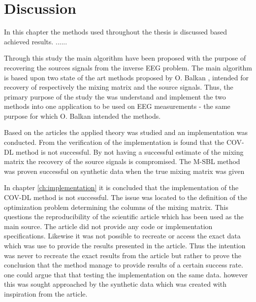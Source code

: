 \chapter{Discussion}
In this chapter the methods used throughout the thesis is discussed based achieved results.  
...... 


Through this study the main algorithm have been proposed with the purpose of recovering the sources signals from the inverse EEG problem. 
The main algorithm is based upon two state of the art methods proposed by O. Balkan \cite{Cov}\cite{M-SBL},
intended for recovery of respectively the mixing matrix and the source signals.  
Thus, the primary purpose of the study the was understand and implement the two methods into one application to be used on EEG measurements - the same purpose for which O. Balkan intended the methods. 

Based on the articles the applied theory was studied and an implementation was conducted. From the verification of the implementation is found that the COV-DL method is not successful. By not having a successful estimate of the mixing matrix the recovery of the source signals is compromised. The M-SBL method was proven successful on synthetic data when the true mixing matrix was given

In chapter \ref{ch:implementation} it is concluded that the implementation of the COV-DL method is not successful.
The issue was located to the definition of the optimization problem determining the columns of the mixing matrix.  
This questions the reproducibility of the scientific article which has been used as the main source. 
The article \cite{cov} did not provide any code or implementation specifications. 
Likewise it was not possible to recreate or access the exact data which was use to provide the results presented in the article. 
Thus the intention was never to recreate the exact results from the article but rather to prove the conclusion that the method manage to provide results of a certain success rate.    
one could argue that that testing the implementation on the same data. however this was sought approached by the synthetic data which was created with inspiration from the article.

